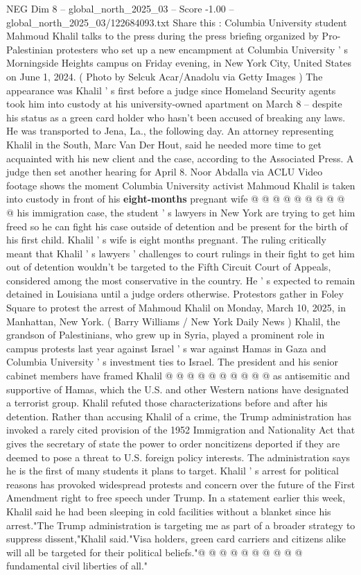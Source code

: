 \begin{textsample}{NEG Dim 8 – global\_north\_2025\_03 – Score -1.00 – global\_north\_2025\_03/122684093.txt}  \label{ex:f8_neg_359}
Share this : Columbia University student Mahmoud Khalil talks to the press during the press briefing organized by Pro-Palestinian protesters who set up a new encampment at Columbia University ' s Morningside Heights campus on Friday evening, in New York City, United States on June 1, 2024. ( Photo by Selcuk Acar/Anadolu via Getty Images ) The appearance was Khalil ' s first before a judge since Homeland Security agents took him into custody at his university-owned apartment on March 8 -- despite his status as a green card holder who hasn't been accused of breaking any laws.
He was transported to Jena, La., the following day.
An attorney representing Khalil in the South, Marc Van Der Hout, said he needed more time to get acquainted with his new client and the case, according to the Associated Press.
A judge then set another hearing for April 8.
Noor Abdalla via ACLU Video footage shows the moment Columbia University activist Mahmoud Khalil is taken into custody in front of his \textbf{eight-months} pregnant wife @ @ @ @ @ @ @ @ @ @ his immigration case, the student ' s lawyers in New York are trying to get him freed so he can fight his case outside of detention and be present for the birth of his first child.
Khalil ' s wife is eight months pregnant.
The ruling critically meant that Khalil ' s lawyers ' challenges to court rulings in their fight to get him out of detention wouldn't be targeted to the Fifth Circuit Court of Appeals, considered among the most conservative in the country.
He ' s expected to remain detained in Louisiana until a judge orders otherwise.
Protestors gather in Foley Square to protest the arrest of Mahmoud Khalil on Monday, March 10, 2025, in Manhattan, New York. ( Barry Williams / New York Daily News ) Khalil, the grandson of Palestinians, who grew up in Syria, played a prominent role in campus protests last year against Israel ' s war against Hamas in Gaza and Columbia University ' s investment ties to Israel.
The president and his senior cabinet members have framed Khalil @ @ @ @ @ @ @ @ @ @ as antisemitic and supportive of Hamas, which the U.S. and other Western nations have designated a terrorist group.
Khalil refuted those characterizations before and after his detention.
Rather than accusing Khalil of a crime, the Trump administration has invoked a rarely cited provision of the 1952 Immigration and Nationality Act that gives the secretary of state the power to order noncitizens deported if they are deemed to pose a threat to U.S. foreign policy interests.
The administration says he is the first of many students it plans to target.
Khalil ' s arrest for political reasons has provoked widespread protests and concern over the future of the First Amendment right to free speech under Trump.
In a statement earlier this week, Khalil said he had been sleeping in cold facilities without a blanket since his arrest."The Trump administration is targeting me as part of a broader strategy to suppress dissent,"Khalil said."Visa holders, green card carriers and citizens alike will all be targeted for their political beliefs."@ @ @ @ @ @ @ @ @ @ fundamental civil liberties of all."

\end{textsample}
